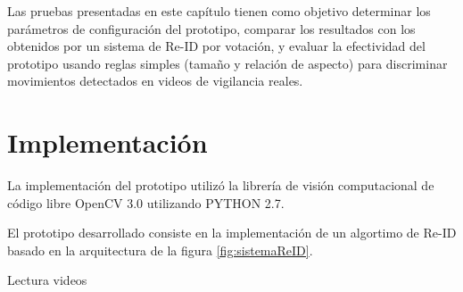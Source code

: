 \documentclass[../memoria.tex]{subfiles}
\begin{document}
\label{experimentos}

Las pruebas presentadas en este capítulo tienen como objetivo determinar los parámetros de configuración del prototipo, comparar los resultados con los obtenidos por un sistema de Re-ID por votación, y evaluar la efectividad del prototipo usando reglas simples (tamaño y relación de aspecto) para discriminar movimientos detectados en videos de vigilancia reales. 

\section{Implementación}

La implementación del prototipo utilizó la librería de visión computacional de código libre OpenCV 3.0 \cite{bradski2000opencv} utilizando PYTHON 2.7.

El prototipo desarrollado consiste en la implementación de un algortimo de Re-ID basado en la arquitectura de la figura \ref{fig:sistemaReID}. 

\begin{algorithm}[h]
\DontPrintSemicolon
{}
\nl {}
\caption{Lectura videos} \label{lectura videos}
\end{algorithm}
\end{document}

